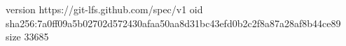 version https://git-lfs.github.com/spec/v1
oid sha256:7a0ff09a5b02702d572430afaa50aa8d31bc43efd0b2c2f8a87a28af8b44ce89
size 33685
